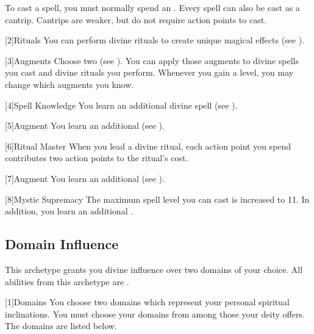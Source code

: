        To cast a spell, you must normally spend an .
        Every spell can also be cast as a cantrip.
        Cantrips are weaker, but do not require action points to cast.

        [2]{Rituals}
        You can perform divine rituals to create unique magical effects (see ).

        [3]{Augments}
        Choose two  (see ).
        You can apply those augments to divine spells you cast and divine rituals you perform.
        Whenever you gain a level, you may change which augments you know.

        [4]{Spell Knowledge}
        You learn an additional divine spell (see ).

        [5]{Augment}
        You learn an additional  (see ).

        [6]{Ritual Master}
        When you lead a divine ritual, each action point you spend contributes two action points to the ritual's cost.

        [7]{Augment}
        You learn an additional  (see ).

        [8]{Mystic Supremacy}
        The maximum spell level you can cast is increased to 11.
        In addition, you learn an additional .

    \subsection{Domain Influence}
        This archetype grants you divine influence over two domains of your choice.
        All abilities from this archetype are .

        [1]{Domains}
        You choose two domains which represent your personal spiritual inclinations.
        You must choose your domains from among those your deity offers.
        The domains are listed below.

